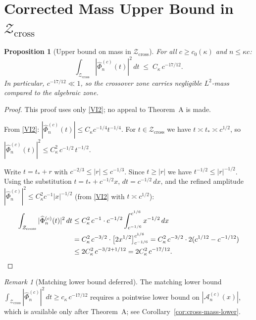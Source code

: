 \documentclass[12pt,a4paper]{amsart}
\newtheorem{proposition}[theorem]{Proposition}
\theoremstyle{definition}
\theoremstyle{remark}
\newtheorem{remark}[theorem]{Remark}
\newcommand{\Zcross}{\mathcal{Z}_{\mathrm{cross}}}
\newcommand{\tstar}{t_*}
\begin{document}
\section{Corrected Mass Upper Bound in $\Zcross$}
\label{sec:mass}

\begin{proposition}[Upper bound on mass in $\Zcross$]
\label{prop:cross-mass}
For all $c \ge c_0(\kappa)$ and $n \le \kappa c$:
\begin{equation}
\label{eq:cross-mass-upper}
\int_{\Zcross}
|\widehat{\Phi}_n^{(c)}(t)|^2\,dt
\;\le\; C_\kappa\, c^{-17/12}.
\end{equation}
In particular, $c^{-17/12} \ll 1$,
so the crossover zone carries negligible $L^2$-mass
compared to the algebraic zone.
\end{proposition}

\begin{proof}
This proof uses only \eqref{VI2}; no appeal
to Theorem~A is made.

From \eqref{VI2}: $|\widehat{\Phi}_n^{(c)}(t)|
\le C_\kappa c^{-1/4} t^{-1/4}$.
For $t \in \Zcross$ we have
$t \asymp \tstar \asymp c^{1/2}$,
so $|\widehat{\Phi}_n^{(c)}(t)|^2
\le C_\kappa^2\, c^{-1/2}\, t^{-1/2}$.

Write $t = \tstar + r$ with
$c^{-2/3} \le |r| \le c^{-1/3}$.
Since $t \ge |r|$ we have $t^{-1/2} \le |r|^{-1/2}$.
Using the substitution $t = \tstar + c^{-1/2}x$,
$dt = c^{-1/2}\,dx$, and the refined amplitude
$|\widehat{\Phi}_n^{(c)}|^2 \le C_\kappa^2 c^{-1} |x|^{-1/2}$
(from \eqref{VI2} with $t \asymp c^{1/2}$):
\begin{align}
\int_{\Zcross} |\widehat{\Phi}_n^{(c)}(t)|^2\,dt
&\le C_\kappa^2\, c^{-1} \cdot c^{-1/2}
\int_{c^{-1/6}}^{c^{1/6}} x^{-1/2}\,dx
\notag\\
&= C_\kappa^2\, c^{-3/2}\cdot
\bigl[2x^{1/2}\bigr]_{c^{-1/6}}^{c^{1/6}}
= C_\kappa^2\,c^{-3/2}\cdot 2(c^{1/12}-c^{-1/12})
\notag\\
&\le 2C_\kappa^2\, c^{-3/2+1/12}
= 2C_\kappa^2\, c^{-17/12}.
\label{eq:cross-sharp}
\end{align}
\end{proof}

\begin{remark}[Matching lower bound deferred]
\label{rem:lower-deferred}
The matching lower bound
$\int_{\Zcross}|\widehat{\Phi}_n^{(c)}|^2\,dt
\ge c_\kappa\, c^{-17/12}$
requires a pointwise lower bound on
$|\mathcal{A}_n^{(c)}(x)|$,
which is available only after Theorem~A;
see Corollary~\ref{cor:cross-mass-lower}.
\end{remark}
\end{document}
